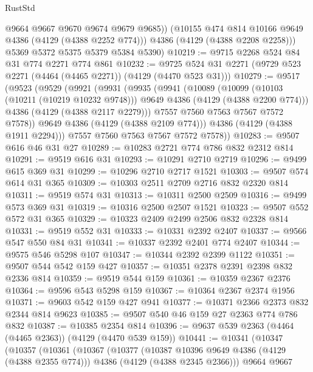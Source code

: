 \begin{lexlean}{RustStd}
\begin{coremodule}
            @9664
            @9667
            @9670
            @9674
            @9679
            @9685))
        (@10155 @474 @814 @10166 @9649 @4386 (@4129 (@4388 @2252 @774)))
        @4386
        (@4129 (@4388 @2208 @2258)))
      @5369
      @5372
      @5375
      @5379
      @5384
      @5390)
@10219 := @9715 @2268 @524 @84 @31 @774 @2271 @774 @861
@10232 := @9725 @524 @31 @2271 (@9729 @523 @2271 (@4464 (@4465 @2271)) (@4129 (@4470 @523 @31)))
@10279 := @9517
    (@9523
      (@9529
        (@9921
          (@9931
            (@9935
              (@9941
                (@10089
                  (@10099
                    (@10103 (@10211 (@10219 @10232 @9748)))
                    @9649
                    @4386
                    (@4129 (@4388 @2200 @774)))
                  @4386
                  (@4129 (@4388 @2117 @2279)))
                @7557
                @7560
                @7563
                @7567
                @7572
                @7578))
            @9649
            @4386
            (@4129 (@4388 @2109 @774)))
          @4386
          (@4129 (@4388 @1911 @2294)))
        @7557
        @7560
        @7563
        @7567
        @7572
        @7578))
@10283 := @9507 @616 @46 @31 @27
@10289 := @10283 @2721 @774 @786 @832 @2312 @814
@10291 := @9519 @616 @31
@10293 := @10291 @2710 @2719
@10296 := @9499 @615 @369 @31
@10299 := @10296 @2710 @2717 @1521
@10303 := @9507 @574 @614 @31 @365
@10309 := @10303 @2511 @2709 @2716 @832 @2320 @814
@10311 := @9519 @574 @31
@10313 := @10311 @2500 @2509
@10316 := @9499 @573 @369 @31
@10319 := @10316 @2500 @2507 @1521
@10323 := @9507 @552 @572 @31 @365
@10329 := @10323 @2409 @2499 @2506 @832 @2328 @814
@10331 := @9519 @552 @31
@10333 := @10331 @2392 @2407
@10337 := @9566 @547 @550 @84 @31
@10341 := @10337 @2392 @2401 @774 @2407
@10344 := @9575 @546 @5298 @107
@10347 := @10344 @2392 @2399 @1122
@10351 := @9507 @544 @542 @159 @427
@10357 := @10351 @2378 @2391 @2398 @832 @2336 @814
@10359 := @9519 @544 @159
@10361 := @10359 @2367 @2376
@10364 := @9596 @543 @5298 @159
@10367 := @10364 @2367 @2374 @1956
@10371 := @9603 @542 @159 @427 @941
@10377 := @10371 @2366 @2373 @832 @2344 @814 @9623
@10385 := @9507 @540 @46 @159 @27 @2363 @774 @786 @832
@10387 := @10385 @2354 @814
@10396 := @9637 @539 @2363 (@4464 (@4465 @2363)) (@4129 (@4470 @539 @159))
@10441 := @10341
    (@10347
      (@10357
        (@10361
          (@10367
            (@10377
              (@10387 @10396 @9649 @4386 (@4129 (@4388 @2355 @774)))
              @4386
              (@4129 (@4388 @2345 @2366)))
            @9664
            @9667

\end{coremodule}
\end{lexlean}
